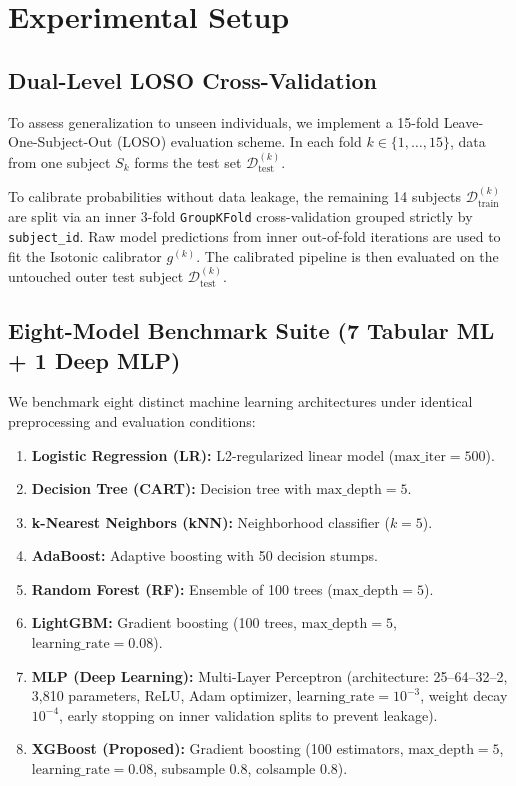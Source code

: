 \documentclass[conference]{IEEEtran}
\begin{document}
\section{Experimental Setup}

\subsection{Dual-Level LOSO Cross-Validation}
To assess generalization to unseen individuals, we implement a 15-fold Leave-One-Subject-Out (LOSO) evaluation scheme. In each fold $k \in \{1, \dots, 15\}$, data from one subject $S_k$ forms the test set $\mathcal{D}_{\text{test}}^{(k)}$. 

To calibrate probabilities without data leakage, the remaining 14 subjects $\mathcal{D}_{\text{train}}^{(k)}$ are split via an inner 3-fold \texttt{GroupKFold} cross-validation grouped strictly by \texttt{subject\_id}. Raw model predictions from inner out-of-fold iterations are used to fit the Isotonic calibrator $g^{(k)}$. The calibrated pipeline is then evaluated on the untouched outer test subject $\mathcal{D}_{\text{test}}^{(k)}$.

\subsection{Eight-Model Benchmark Suite (7 Tabular ML + 1 Deep MLP)}
We benchmark eight distinct machine learning architectures under identical preprocessing and evaluation conditions:
\begin{enumerate}
    \item \textbf{Logistic Regression (LR):} L2-regularized linear model ($\text{max\_iter}=500$).
    \item \textbf{Decision Tree (CART):} Decision tree with $\text{max\_depth}=5$.
    \item \textbf{k-Nearest Neighbors (kNN):} Neighborhood classifier ($k=5$).
    \item \textbf{AdaBoost:} Adaptive boosting with 50 decision stumps.
    \item \textbf{Random Forest (RF):} Ensemble of 100 trees ($\text{max\_depth}=5$).
    \item \textbf{LightGBM:} Gradient boosting (100 trees, $\text{max\_depth}=5$, $\text{learning\_rate}=0.08$).
    \item \textbf{MLP (Deep Learning):} Multi-Layer Perceptron (architecture: 25--64--32--2, 3,810 parameters, ReLU, Adam optimizer, $\text{learning\_rate}=10^{-3}$, weight decay $10^{-4}$, early stopping on inner validation splits to prevent leakage).
    \item \textbf{XGBoost (Proposed):} Gradient boosting (100 estimators, $\text{max\_depth}=5$, $\text{learning\_rate}=0.08$, subsample $0.8$, colsample $0.8$).
\end{enumerate}
\end{document}
